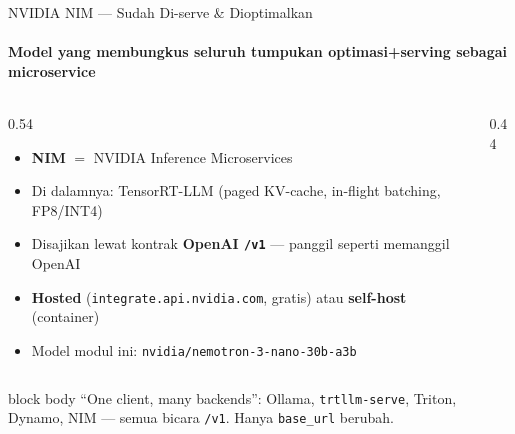 \documentclass[aspectratio=169,t]{beamer}
\newcommand{\takeaway}[1]{%
  \vspace{0.3em}
  \begin{beamercolorbox}[rounded=true,shadow=false,sep=6pt]{block body}
    \centering\small\color{nvlightgreen}#1
  \end{beamercolorbox}%
}
\begin{document}
\begin{frame}{NVIDIA NIM --- Sudah Di-serve \& Dioptimalkan}
  \framesubtitle{Model yang membungkus seluruh tumpukan optimasi+serving sebagai microservice}
  \begin{columns}[T]
    \begin{column}{0.54\textwidth}
      \begin{itemize}\footnotesize
        \item \textbf{NIM} $=$ NVIDIA Inference Microservices
        \item Di dalamnya: TensorRT-LLM (paged KV-cache, in-flight batching, FP8/INT4)
        \item Disajikan lewat kontrak \textbf{OpenAI \texttt{/v1}} --- panggil seperti memanggil OpenAI
        \item \textbf{Hosted} (\texttt{integrate.api.nvidia.com}, gratis) atau \textbf{self-host} (container)
        \item Model modul ini: \texttt{nvidia/nemotron-3-nano-30b-a3b}
      \end{itemize}
    \end{column}
    \begin{column}{0.44\textwidth}
      \begin{center}
      \end{center}
    \end{column}
  \end{columns}
  \takeaway{``One client, many backends'': Ollama, \texttt{trtllm-serve}, Triton, Dynamo, NIM --- semua bicara \texttt{/v1}. Hanya \texttt{base\_url} berubah.}
\end{frame}
\end{document}

